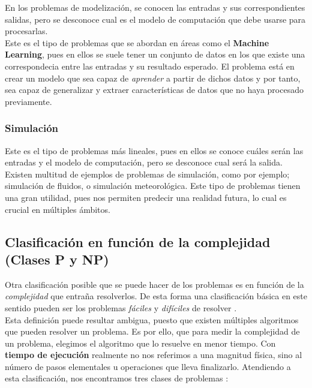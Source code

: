 En los problemas de modelización, se conocen las entradas y sus correspondientes salidas, pero se desconoce cual es el modelo de computación que debe usarse para procesarlas. \\


Este es el tipo de problemas que se abordan en áreas como el \textbf{Machine Learning}, pues en ellos se suele tener un conjunto de datos en los que existe una correspondecia entre las entradas y su resultado esperado. El problema está en crear un modelo que sea capaz de \textit{aprender} a partir de dichos datos y por tanto, sea capaz de generalizar y extraer características de datos que no haya procesado previamente.

\subsubsection{Simulación}

Este es el tipo de problemas más lineales, pues en ellos se conoce cuáles serán las entradas y el modelo de computación, pero se desconoce cual será la salida. \\

Existen multitud de ejemplos de problemas de simulación, como por ejemplo; simulación de fluidos, o simulación meteorológica. Este tipo de problemas tienen una gran utilidad, pues nos permiten predecir una realidad futura, lo cual es crucial en múltiples ámbitos. \\


\subsection{Clasificación en función de la complejidad (Clases P y NP)}

Otra clasificación posible que se puede hacer de los problemas es en función de la \textit{complejidad} que entraña resolverlos. De esta forma una clasificación básica en este sentido pueden ser los problemas \textit{fáciles} y \textit{difíciles} de resolver \cite{garey2002computers}.\\

Esta definición puede resultar ambigua, puesto que existen múltiples algoritmos que pueden resolver un problema. Es por ello, que para medir la complejidad de un problema, elegimos el algoritmo que lo resuelve en menor tiempo. Con \textbf{tiempo de ejecución} realmente no nos referimos a una magnitud física, sino al número de pasos elementales u operaciones que lleva finalizarlo. Atendiendo a esta clasificación, nos encontramos tres clases de problemas \cite{papadimitriou2003computational}:


